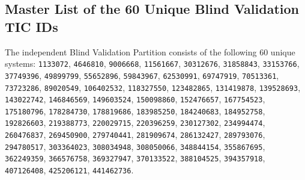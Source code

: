 \subsection{Master List of the 60 Unique Blind Validation TIC IDs} \label{sec:app_tic_list}
The independent Blind Validation Partition consists of the following 60 unique systems:
\texttt{1133072}, \texttt{4646810}, \texttt{9006668}, \texttt{11561667}, \texttt{30312676}, \texttt{31858843}, \texttt{33153766}, \texttt{37749396}, \texttt{49899799}, \texttt{55652896}, \texttt{59843967}, \texttt{62530991}, \texttt{69747919}, \texttt{70513361}, \texttt{73723286}, \texttt{89020549}, \texttt{106402532}, \texttt{118327550}, \texttt{123482865}, \texttt{131419878}, \texttt{139528693}, \texttt{143022742}, \texttt{146846569}, \texttt{149603524}, \texttt{150098860}, \texttt{152476657}, \texttt{167754523}, \texttt{175180796}, \texttt{178284730}, \texttt{178819686}, \texttt{183985250}, \texttt{184240683}, \texttt{184952758}, \texttt{192826603}, \texttt{219388773}, \texttt{220029715}, \texttt{220396259}, \texttt{230127302}, \texttt{234994474}, \texttt{260476837}, \texttt{269450900}, \texttt{279740441}, \texttt{281909674}, \texttt{286132427}, \texttt{289793076}, \texttt{294780517}, \texttt{303364023}, \texttt{308034948}, \texttt{308050066}, \texttt{348844154}, \texttt{355867695}, \texttt{362249359}, \texttt{366576758}, \texttt{369327947}, \texttt{370133522}, \texttt{388104525}, \texttt{394357918}, \texttt{407126408}, \texttt{425206121}, \texttt{441462736}.

